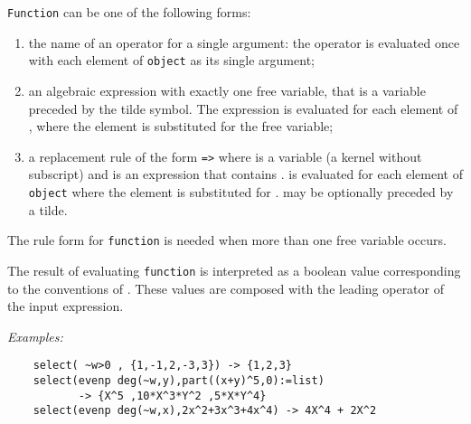 \texttt{Function} can be one of the following forms:
\begin{enumerate}
\item the name of an operator for a single argument: the operator
is evaluated once with each element of \texttt{object} as its single argument;
\item an algebraic expression with exactly one free variable, that is
a variable preceded by the tilde symbol. The expression
is evaluated for each element of , where the element is
substituted for the free variable;
\item a replacement rule of the form  \texttt{=>} 
where  is a variable (a kernel without subscript)
and  is an expression that contains .
 is evaluated for each element of \texttt{object} where
the element is substituted for  .  may be
optionally preceded by a tilde.
\end{enumerate}
The rule form  for \texttt{function} is needed when more than
one free variable occurs.

The result of evaluating \texttt{function} is
interpreted as a boolean value corresponding to the conventions of
{\REDUCE}. These values are composed with the leading operator of the
input expression.

\textit{Examples:}\nopagebreak
\begin{verbatim}
    select( ~w>0 , {1,-1,2,-3,3}) -> {1,2,3}
    select(evenp deg(~w,y),part((x+y)^5,0):=list)
           -> {X^5 ,10*X^3*Y^2 ,5*X*Y^4}
    select(evenp deg(~w,x),2x^2+3x^3+4x^4) -> 4X^4 + 2X^2
\end{verbatim}


